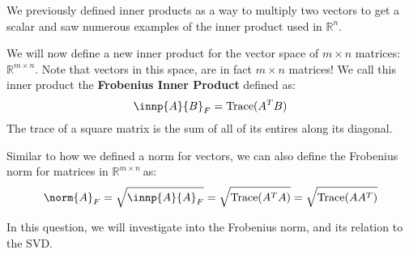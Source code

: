 

We previously defined inner products as a way to multiply two vectors to get a scalar and saw numerous examples of the inner product used in $\mathbb{R}^{n}.$

We will now define a new inner product for the vector space of $m \times n$ matrices: $\mathbb{R}^{m \times n}.$
Note that vectors in this space, are in fact $m \times n$ matrices!
We call this inner product the \textbf{Frobenius Inner Product} defined as:
\begin{equation}
  \innp{A}{B}_{F} = \text{Trace}(A^{T} B)
\end{equation}
The trace of a square matrix is the sum of all of its entires along its diagonal.

Similar to how we defined a norm for vectors, we can also define the Frobenius norm for matrices in $\mathbb{R}^{m \times n}\ $as:
\begin{equation}
  \norm{A}_{F} = \sqrt{\innp{A}{A}_{F}} = \sqrt{\text{Trace}(A^{T} A)} = \sqrt{\text{Trace}(A A^{T})}
\end{equation}

In this question, we will investigate into the Frobenius norm, and its relation to the SVD.

